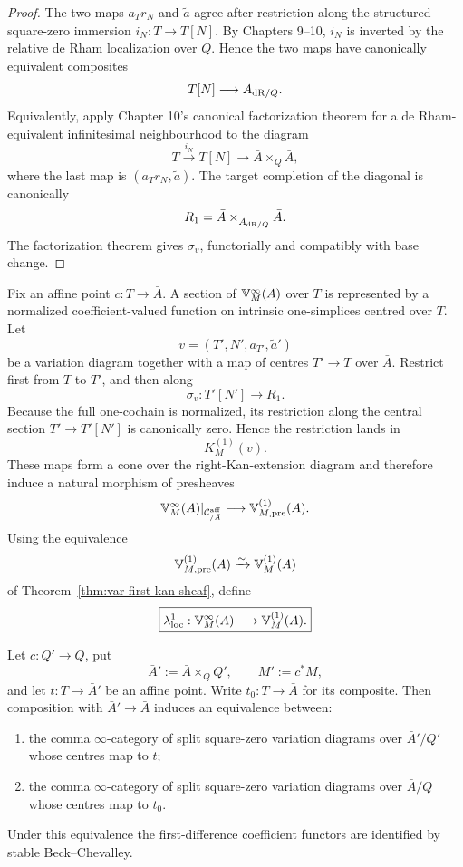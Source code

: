 \begin{proof}
The two maps \(a_Tr_N\) and \(\widetilde a\) agree after restriction along the structured square-zero immersion \(i_N:T\to T[N]\). By Chapters 9--10, \(i_N\) is inverted by the relative de Rham localization over \(Q\). Hence the two maps have canonically equivalent composites
\[
    T[N]\longrightarrow\bar A_{\mathrm{dR}/Q}.
\]
Equivalently, apply Chapter 10's canonical factorization theorem for a de Rham-equivalent infinitesimal neighbourhood to the diagram
\[
    T\xrightarrow{i_N}T[N]
    \longrightarrow
    \bar A\times_Q\bar A,
\]
where the last map is \((a_Tr_N,\widetilde a)\). The target completion of the diagonal is canonically
\[
    R_1=\bar A\times_{\bar A_{\mathrm{dR}/Q}}\bar A.
\]
The factorization theorem gives \(\sigma_v\), functorially and compatibly with base change.
\end{proof}

\begin{construction}
\label{con:var-local-square-zero-restriction}
Fix an affine point \(c:T\to\bar A\). A section of \(\mathbb V^{\infty}_M(A)\) over \(T\) is represented by a normalized coefficient-valued function on intrinsic one-simplices centred over \(T\). Let
\[
    v=(T',N',a_{T'},\widetilde a')
\]
be a variation diagram together with a map of centres \(T'\to T\) over \(\bar A\). Restrict first from \(T\) to \(T'\), and then along
\[
    \sigma_v:T'[N']\to R_1.
\]
Because the full one-cochain is normalized, its restriction along the central section \(T'\to T'[N']\) is canonically zero. Hence the restriction lands in
\[
    K_M^{(1)}(v).
\]
These maps form a cone over the right-Kan-extension diagram and therefore induce a natural morphism of presheaves
\[
    \mathbb V^{\infty}_M(A)|_{\mathcal C^{\mathrm{aff}}_{/\bar A}}
    \longrightarrow
    \mathbb V^{(1)}_{M,\mathrm{pre}}(A).
\]
Using the equivalence
\[
    \mathbb V^{(1)}_{M,\mathrm{pre}}(A)\xrightarrow{\sim}\mathbb V^{(1)}_M(A)
\]
of Theorem~\ref{thm:var-first-kan-sheaf}, define
\[
    \boxed{
    \lambda^1_{\mathrm{loc}}:
    \mathbb V^{\infty}_M(A)
    \longrightarrow
    \mathbb V^{(1)}_M(A).
    }
\]
\end{construction}

\begin{proposition}
\label{prop:var-first-affine-base-change}
Let \(c:Q'\to Q\), put
\[
    \bar A':=\bar A\times_QQ',
    \qquad
    M':=c^*M,
\]
and let \(t:T\to\bar A'\) be an affine point. Write \(t_0:T\to\bar A\) for its composite. Then composition with \(\bar A'\to\bar A\) induces an equivalence between:
\begin{enumerate}
\item the comma \(\infty\)-category of split square-zero variation diagrams over \(\bar A'/Q'\) whose centres map to \(t\);
\item the comma \(\infty\)-category of split square-zero variation diagrams over \(\bar A/Q\) whose centres map to \(t_0\).
\end{enumerate}
Under this equivalence the first-difference coefficient functors are identified by stable Beck--Chevalley.
\end{proposition}

